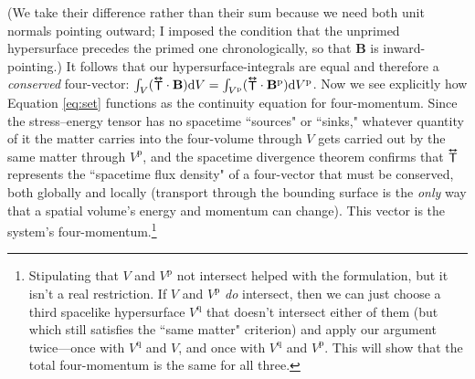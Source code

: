\documentclass[12pt]{article}
\renewcommand{\vv}[1]{\mathbf{#1}}
\newcommand{\dd}[1]{\mathrm{d}#1}
\newcommand{\tightoverset}[2]{%
  \mathop{#2}\limits^{\vbox to -.5ex{\kern-0.75ex\hbox{$#1$}\vss}}}
\newcommand{\inlinedy}[1]{\tightoverset{\text{\tiny$\bm\leftrightarrow$}}{#1}}
\begin{document}
(We take their difference rather than their sum because we need both unit normals pointing outward; I imposed the condition that the unprimed hypersurface precedes the primed one chronologically, so that $\vv B$ is inward-pointing.) It follows that our hypersurface-integrals are equal and therefore a \emph{conserved} four-vector: ${\int_V ({\inlinedy{\mathsf{T}}} \cdot \vv B) \dd V} = \int_{V^\textrm{p}} ({\inlinedy{\mathsf{T}}} \cdot \vv B^{\textrm{p}}) \dd V^\textrm{p}$. Now we see explicitly how Equation \ref{eq:set} functions as the continuity equation for four-momentum. Since the stress--energy tensor has no spacetime ``sources" or ``sinks," whatever quantity of it the matter carries into the four-volume through $V$ gets carried out by the same matter through $V^\textrm{p}$, and the spacetime divergence theorem confirms that ${\inlinedy{\mathsf{T}}}$ represents the ``spacetime flux density" of a four-vector that must be conserved, both globally and locally (transport through the bounding surface is the \emph{only} way that a spatial volume's energy and momentum can change). This vector is the system's four-momentum.\footnote{Stipulating that $V$ and $V^{\textrm{p}}$ not intersect helped with the formulation, but it isn't a real restriction. If $V$ and $V^{\textrm{p}}$ \emph{do} intersect, then we can just choose a third spacelike hypersurface $V^{\textrm{q}}$ that doesn't intersect either of them (but which still satisfies the ``same matter" criterion) and apply our argument twice---once with $V^{\textrm{q}}$ and $V$, and once with $V^{\textrm{q}}$ and $V^{\textrm{p}}$. This will show that the total four-momentum is the same for all three.}
\end{document}

